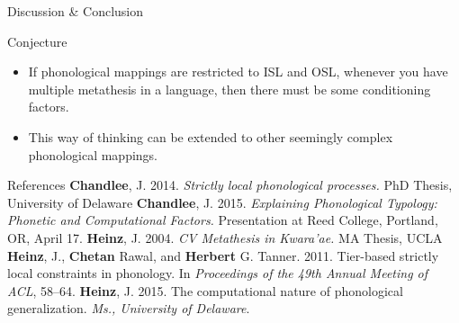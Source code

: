 \documentclass[professionalfonts, xcolor={usenames,svgnames,x11names,table}]{beamer}
\begin{document}
		\begin{frame}{Discussion \& Conclusion}
		
		\begin{exampleblock}{}
			\begin{center}
				\color{red}{Factorization of the grammar into different sub-processes makes it possible to produce simpler computational processes of phonological patterns.}
			\end{center}
		\end{exampleblock}
		
		\begin{alertblock}{Conjecture}
			\begin{itemize}
				\item If phonological mappings are restricted to ISL and OSL, whenever you have multiple metathesis in a language, then there must be some conditioning factors. 
				\item This way of thinking can be extended to other seemingly complex phonological mappings. 
			\end{itemize}
		\end{alertblock}
		
	\end{frame}

	\begin{frame}{References} 
\noindent%
\newline
\textbf{Chandlee}, J. 2014. \textit{Strictly local phonological processes.} PhD Thesis, University of Delaware 
\newline
\textbf{Chandlee}, J. 2015. \textit{Explaining Phonological Typology: Phonetic and Computational	Factors.}  Presentation at Reed College, Portland, OR, April 17.
\newline
\textbf{Heinz}, J. 2004. \textit{CV Metathesis in Kwara'ae.} MA Thesis, UCLA 
\newline
\textbf{Heinz}, J., \textbf{Chetan} Rawal, and \textbf{Herbert} G. Tanner. 2011. Tier-based strictly local constraints in phonology. In \textit{Proceedings of the 49th Annual Meeting of ACL}, 58--64.  
\newline
\textbf{Heinz}, J. 2015. The computational nature of phonological generalization. \textit{Ms., University of Delaware}.

	\end{frame}
\end{document}

